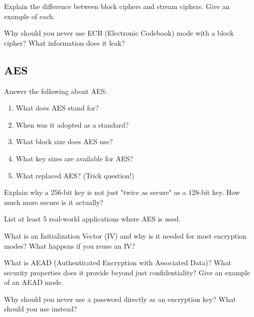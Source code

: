 \documentclass[11pt,a4paper]{report}
\begin{document}
\begin{ex}
Explain the difference between block ciphers and stream ciphers. Give an example of each.
\end{ex}

\begin{ex}
Why should you never use ECB (Electronic Codebook) mode with a block cipher? What information does it leak?
\end{ex}

\subsection{AES}

\begin{ex}
Answer the following about AES:
\begin{enumerate}[label=\alph*)]
    \item What does AES stand for?
    \item When was it adopted as a standard?
    \item What block size does AES use?
    \item What key sizes are available for AES?
    \item What replaced AES? (Trick question!)
\end{enumerate}
\end{ex}

\begin{ex}
Explain why a 256-bit key is not just "twice as secure" as a 128-bit key. How much more secure is it actually?
\end{ex}

\begin{ex}
List at least 5 real-world applications where AES is used.
\end{ex}

\begin{ex}
What is an Initialization Vector (IV) and why is it needed for most encryption modes? What happens if you reuse an IV?
\end{ex}

\begin{ex}
What is AEAD (Authenticated Encryption with Associated Data)? What security properties does it provide beyond just confidentiality? Give an example of an AEAD mode.
\end{ex}

\begin{ex}
Why should you never use a password directly as an encryption key? What should you use instead?
\end{ex}
\end{document}
